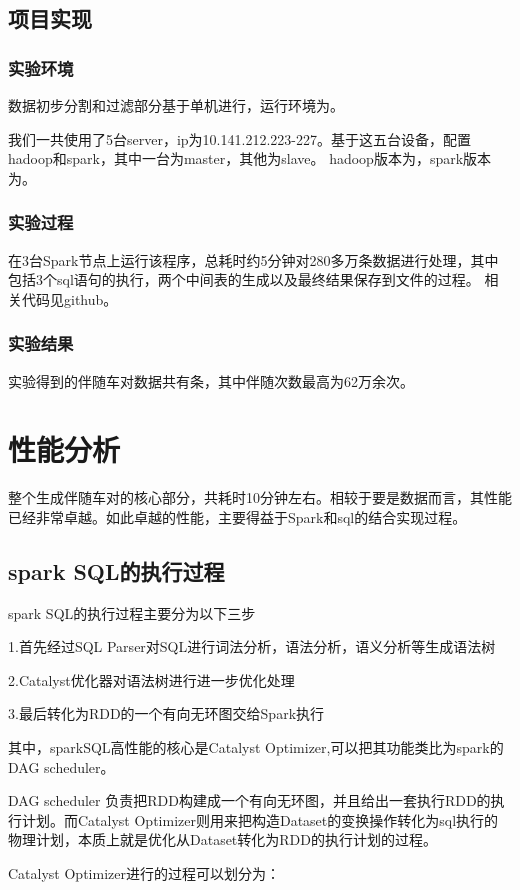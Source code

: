 \documentclass[CJK]{ctexart}
\begin{document}
\begin{multicols}{2}
\subsection{项目实现}
\subsubsection{实验环境}
    数据初步分割和过滤部分基于单机进行，运行环境为。

    我们一共使用了5台server，ip为10.141.212.223-227。基于这五台设备，配置hadoop和spark，其中一台为master，其他为slave。
    hadoop版本为，spark版本为。
\subsubsection{实验过程}
    在3台Spark节点上运行该程序，总耗时约5分钟对280多万条数据进行处理，其中包括3个sql语句的执行，两个中间表的生成以及最终结果保存到文件的过程。
    相关代码见github。
\subsubsection{实验结果}
    实验得到的伴随车对数据共有条，其中伴随次数最高为62万余次。

\section{性能分析}
    整个生成伴随车对的核心部分，共耗时10分钟左右。相较于要是数据而言，其性能已经非常卓越。如此卓越的性能，主要得益于Spark和sql的结合实现过程。

\subsection{spark SQL的执行过程}
spark SQL的执行过程主要分为以下三步

1.首先经过SQL Parser对SQL进行词法分析，语法分析，语义分析等生成语法树

2.Catalyst优化器对语法树进行进一步优化处理

3.最后转化为RDD的一个有向无环图交给Spark执行

其中，sparkSQL高性能的核心是Catalyst Optimizer,可以把其功能类比为spark的DAG scheduler。

DAG scheduler 负责把RDD构建成一个有向无环图，并且给出一套执行RDD的执行计划。而Catalyst Optimizer则用来把构造Dataset的变换操作转化为sql执行的物理计划，本质上就是优化从Dataset转化为RDD的执行计划的过程。

Catalyst Optimizer进行的过程可以划分为：


\end{multicols}
\end{document}
